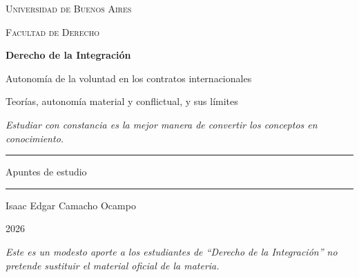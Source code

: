 \documentclass[12pt,oneside]{book}
\newcommand{\universidad}{Universidad de Buenos Aires}
\newcommand{\facultad}{Facultad de Derecho}
\newcommand{\materia}{Derecho de la Integraci\'on}
\newcommand{\autor}{Isaac Edgar Camacho Ocampo}
\newcommand{\anio}{2026}
\begin{document}
\begin{titlepage}

\thispagestyle{empty}

\begin{center}

\vspace*{1cm}

{\large \textsc{\universidad}}

\vspace{0.2cm}

{\large \textsc{\facultad}}

\vspace{3cm}

{\Huge \textbf{\materia}}

\vspace{1cm}

{\LARGE Autonom\'ia de la voluntad en los contratos internacionales}

\vspace{0.4cm}

{\large Teor\'ias, autonom\'ia material y conflictual, y sus l\'imites}

\vspace{0.8cm}

\textit{Estudiar con constancia es la mejor manera de convertir los conceptos en conocimiento.}

\vspace{1.2cm}

\rule{0.70\textwidth}{0.5pt}

\vspace{0.5cm}

{\large Apuntes de estudio}

\vspace{0.5cm}

\rule{0.70\textwidth}{0.5pt}

\vfill

{\large \autor}

\vspace{0.3cm}

{\large \anio}

\end{center}

\vfill

\begin{flushleft}
\textit{Este es un modesto aporte a los estudiantes de ``Derecho de la Integraci\'on'' no pretende sustituir el material oficial de la materia.}
\end{flushleft}

\end{titlepage}
\end{document}
